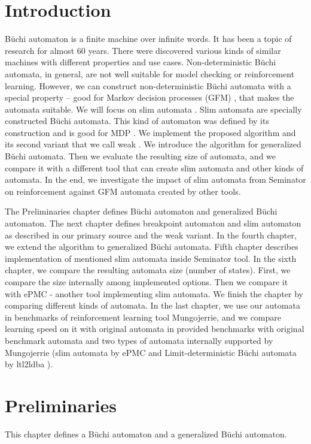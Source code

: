 \documentclass[
	digital,
nolof, nolot
]{fithesis3}
\begin{document}
	\chapter{Introduction}
	Büchi automaton is a finite machine over infinite words. It has been a topic of research for almost 60 years.
	There were discovered various kinds of similar machines with different properties and use cases.
	Non-deterministic Büchi automata, in general, are not well suitable for model checking or reinforcement learning. However, we can construct non-deterministic Büchi automata with a special property -- good for Markov decision processes (GFM)  \cite{hlavni}, that makes the automata suitable. We will focus on slim automata \cite{hlavni}.
	Slim automata are specially constructed Büchi automata. This kind of automaton was defined by its construction and is good for MDP \cite{hlavni}. We implement the proposed algorithm and its second variant that we call weak \cite{priv}. We introduce the algorithm for generalized Büchi automata. Then we evaluate the resulting size of automata, and we compare it with a different tool that can create slim automata and other kinds of automata. In the end, we investigate the impact of slim automata from Seminator on reinforcement against GFM automata created by other tools.
	
	The Preliminaries chapter defines Büchi automaton and generalized Büchi automaton.
	The next chapter defines breakpoint automaton and slim automaton as described in our primary source \cite{hlavni} and the weak variant.
	In the fourth chapter, we extend the algorithm to generalized Büchi automata.
	Fifth chapter describes implementation of mentioned slim automata inside Seminator \cite{Klokočka2017thesis}\cite{seminator}\cite{seminator2} tool.
	In the sixth chapter, we compare the resulting automata size (number of states). First, we compare the size internally among implemented options. Then we compare it with ePMC \cite{epmc} - another tool implementing slim automata. We finish the chapter by comparing different kinds of automata.
	In the last chapter, we use our automata in benchmarks of reinforcement learning tool Mungojerrie\cite{mungojerrie}, and we compare learning speed on it with original automata in provided benchmarks with original benchmark automata and two types of automata internally supported by Mungojerrie (slim automata by ePMC and Limit-deterministic Büchi automata by ltl2ldba \cite{ltl2ldba}).
	
	

	\chapter{Preliminaries}
		This chapter defines a Büchi automaton and a generalized Büchi automaton. 
		
\end{document}
